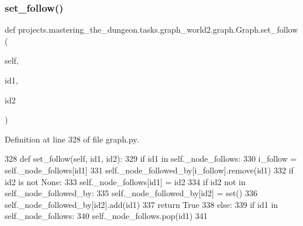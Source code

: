 \subsubsection{\texorpdfstring{set\+\_\+follow()}{set\_follow()}}
{\footnotesize\ttfamily def projects.\+mastering\+\_\+the\+\_\+dungeon.\+tasks.\+graph\+\_\+world2.\+graph.\+Graph.\+set\+\_\+follow (\begin{DoxyParamCaption}\item[{}]{self,  }\item[{}]{id1,  }\item[{}]{id2 }\end{DoxyParamCaption})}



Definition at line 328 of file graph.\+py.


\begin{DoxyCode}
328     \textcolor{keyword}{def }set\_follow(self, id1, id2):
329         \textcolor{keywordflow}{if} id1 \textcolor{keywordflow}{in} self.\_node\_follows:
330             i\_follow = self.\_node\_follows[id1]
331             self.\_node\_followed\_by[i\_follow].remove(id1)
332         \textcolor{keywordflow}{if} id2 \textcolor{keywordflow}{is} \textcolor{keywordflow}{not} \textcolor{keywordtype}{None}:
333             self.\_node\_follows[id1] = id2
334             \textcolor{keywordflow}{if} id2 \textcolor{keywordflow}{not} \textcolor{keywordflow}{in} self.\_node\_followed\_by:
335                 self.\_node\_followed\_by[id2] = set()
336             self.\_node\_followed\_by[id2].add(id1)
337             \textcolor{keywordflow}{return} \textcolor{keyword}{True}
338         \textcolor{keywordflow}{else}:
339             \textcolor{keywordflow}{if} id1 \textcolor{keywordflow}{in} self.\_node\_follows:
340                 self.\_node\_follows.pop(id1)
341 
\end{DoxyCode}
\mbox{\label{classprojects_1_1mastering__the__dungeon_1_1tasks_1_1graph__world2_1_1graph_1_1Graph_aea241c8e3a1ac9af2517454c76208ce4}} 
